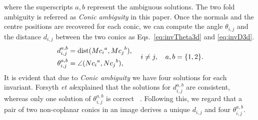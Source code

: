 \documentclass{bmvc2k}
\def\etal{\emph{et al}\bmvaOneDot}
\begin{document}
where the superscripts $a,b$ represent the ambiguous solutions.
The two fold ambiguity is referred as \textit{ Conic ambiguity} in this paper.
Once the normals and the centre positions are recovered for each conic, we can compute the angle $\theta_{i,j}$ and the distance $d_{i,j}$ between the two conics as Eqs.~\ref{eq:invTheta3d} and \ref{eq:invD3d}. 
\begin{align}\label{eq:inv2D}
\left. \begin{aligned}
d_{i,j}^{a,b} &= {\rm dist}({Mc_i}^a,{Mc_j}^b),\\
\theta_{i,j}^{a,b} &= \angle({Nc_i}^a,{Nc_j}^b),
\end{aligned}
\right. ~~~i \neq j, ~~~ a,b = \{ 1,2 \}.
\end{align}
It is evident that due to \textit{Conic ambiguity} we have four solutions for each invariant. 
Forsyth \etal explained that the solutions for $d_{i,j}^{a,b}$ are consistent, whereas only one solution of $\theta_{i,j}^{a,b}$ is correct ~\cite{forsyth_91}.
Following this, we regard that a pair of two non-coplanar conics in an image derives a unique $d_{i,j}$ and four $\theta_{i,j}^{a,b}$.
\end{document}
